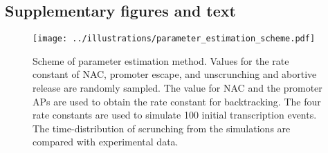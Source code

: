 \subsection{Supplementary figures and text}

\begin{figure}
    \begin{center}
      \texttt{[image: ../illustrations/parameter\_estimation\_scheme.pdf]}
    \end{center}
    \caption{Scheme of parameter estimation method. Values for the rate
    constant of NAC, promoter escape, and unscrunching and abortive release
    are randomly sampled. The value for NAC and the promoter APs are used to
    obtain the rate constant for backtracking. The four rate constants are
    used to simulate 100 initial transcription events. The time-distribution
    of scrunching from the simulations are compared with experimental data.}
    \label{fig:parameter_estimation_scheme}
\end{figure}
